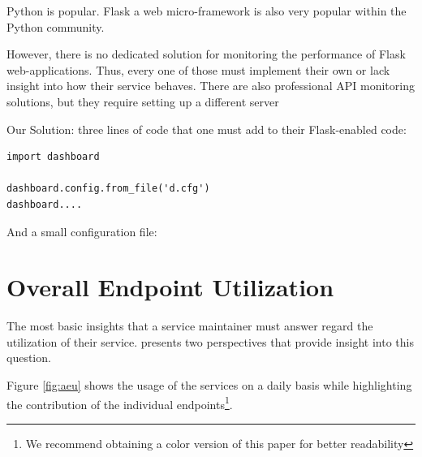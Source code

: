 \documentclass[conference]{IEEEtran}
\begin{document}
Python is popular. Flask a web micro-framework is also very popular within the Python community. 

However, there is no dedicated solution for monitoring the performance of Flask web-applications. Thus, every one of those  must implement their own or lack insight into how their service behaves. There are also professional API monitoring solutions, but they require setting up a different server 

Our Solution: three lines of code that one must add to their Flask-enabled code:

\begin{lstlisting}
import dashboard

dashboard.config.from_file('d.cfg')
dashboard....

\end{lstlisting}

And a small configuration file: 






\section{Overall Endpoint Utilization}

  The most basic insights that a service maintainer must answer regard the utilization of their service. \tool presents two perspectives that provide insight into this question. 


  Figure \ref{fig:aeu} shows the usage of the services on a daily basis while highlighting the contribution of the individual endpoints\footnote{We recommend obtaining a color version of this paper for better readability}. 
\end{document}
